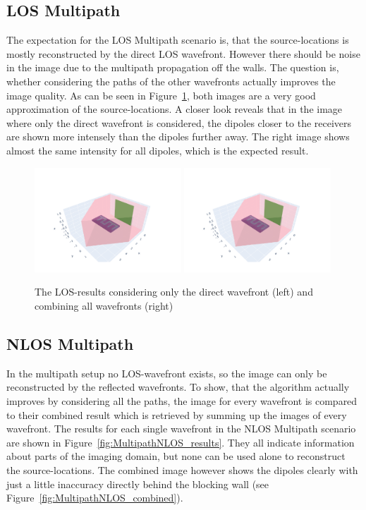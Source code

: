 \subsection{LOS Multipath}
The expectation for the LOS Multipath scenario is, that the source-locations is mostly reconstructed by the direct LOS wavefront.
However there should be noise in the image due to the multipath propagation off the walls.
The question is, whether considering the paths of the other wavefronts actually improves the image quality.
As can be seen in Figure~\ref{fig:MultipathLOS}, both images are a very good approximation of the source-locations.
A closer look reveals that in the image where only the direct wavefront is considered, the dipoles closer to the receivers are shown more intensely than the dipoles further away.
The right image shows almost the same intensity for all dipoles, which is the expected result.

\begin{figure}
    \centering
    \includegraphics[width=0.49\textwidth]{figures/result_multipath_los_direct.pdf}
    \includegraphics[width=0.49\textwidth]{figures/result_multipath_los_combined.pdf}
    \caption{The LOS-results considering only the direct wavefront (left) and combining all wavefronts (right)}\label{fig:MultipathLOS}
\end{figure}


\subsection{NLOS Multipath}
In the multipath setup no LOS-wavefront exists, so the image can only be reconstructed by the reflected wavefronts.
To show, that the algorithm actually improves by considering all the paths, the image for every wavefront is compared to their combined result which is retrieved by summing up the images of every wavefront.
The results for each single wavefront in the NLOS Multipath scenario are shown in Figure~\ref{fig:MultipathNLOS_results}.
They all indicate information about parts of the imaging domain, but none can be used alone to reconstruct the source-locations.
The combined image however shows the dipoles clearly with just a little inaccuracy directly behind the blocking wall (see Figure~\ref{fig:MultipathNLOS_combined}).

